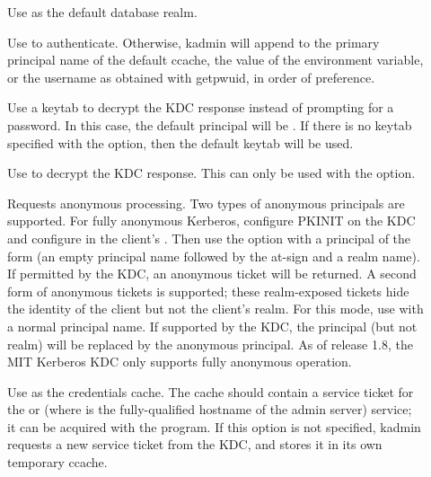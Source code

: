 \documentclass[letterpaper,10pt,english]{sphinxmanual}
\begin{document}
\begin{description}
\item[{ }] \leavevmode
Use  as the default database realm.

\item[{ }] \leavevmode
Use  to authenticate.  Otherwise, kadmin will append
 to the primary principal name of the default ccache,
the value of the  environment variable, or the username as
obtained with getpwuid, in order of preference.

\item[{}] \leavevmode
Use a keytab to decrypt the KDC response instead of prompting for
a password.  In this case, the default principal will be
.  If there is no keytab specified with the
 option, then the default keytab will be used.

\item[{ }] \leavevmode
Use  to decrypt the KDC response.  This can only be used
with the  option.

\item[{}] \leavevmode
Requests anonymous processing.  Two types of anonymous principals
are supported.  For fully anonymous Kerberos, configure PKINIT on
the KDC and configure  in the client’s
{\hyperref[\detokenize{admin/conf_files/krb5_conf:krb5-conf-5}]{}}.  Then use the  option with a principal
of the form  (an empty principal name followed by the
at-sign and a realm name).  If permitted by the KDC, an anonymous
ticket will be returned.  A second form of anonymous tickets is
supported; these realm-exposed tickets hide the identity of the
client but not the client’s realm.  For this mode, use  with a normal principal name.  If supported by the KDC, the
principal (but not realm) will be replaced by the anonymous
principal.  As of release 1.8, the MIT Kerberos KDC only supports
fully anonymous operation.

\item[{ }] \leavevmode
Use  as the credentials cache.  The cache
should contain a service ticket for the  or
 (where  is the fully-qualified
hostname of the admin server) service; it can be acquired with the
 program.  If this option is not specified, kadmin
requests a new service ticket from the KDC, and stores it in its
own temporary ccache.


\end{description}
\end{document}
